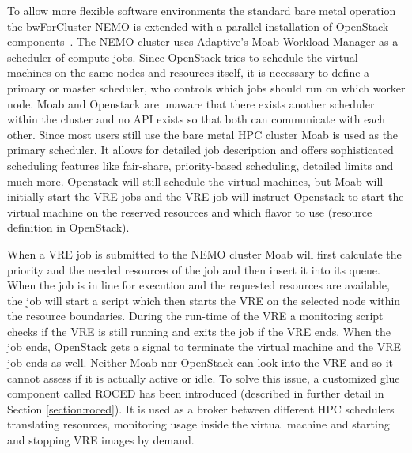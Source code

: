 To allow more flexible software environments the standard bare metal operation
the bwForCluster NEMO is extended with a parallel installation of OpenStack
components~\cite{hpc-symp:2016}.
The NEMO cluster uses Adaptive's Moab Workload Manager as a
scheduler of compute jobs.
Since OpenStack tries to schedule the virtual machines on the same nodes and
resources itself, it is necessary to define a primary or master scheduler, who
controls which jobs should run on which worker node. Moab and Openstack are
unaware that there exists another scheduler within the cluster and no API exists
so that both can communicate with each other. Since most users still use the
bare metal HPC cluster Moab is used as the primary scheduler. It allows for
detailed job description and offers sophisticated scheduling features like
fair-share, priority-based scheduling, detailed limits and much more. Openstack
will still schedule the virtual machines, but Moab will initially start the VRE
jobs and the VRE job will instruct Openstack to start the virtual machine on the
reserved resources and which flavor to use (resource definition in OpenStack).

When a VRE job is submitted to the NEMO cluster Moab will first calculate the
priority and the needed resources of the job and then insert it into its queue.
When the job is in line for execution and the requested resources are available,
the job will start a script which then starts the VRE on the selected node
within the resource boundaries. During the run-time of the VRE a monitoring
script checks if the VRE is still running and exits the job if the VRE ends.
When the job ends, OpenStack gets a signal to terminate the virtual machine and
the VRE job ends as well.  Neither Moab nor OpenStack can look into the VRE and
so it cannot assess if it is actually active or idle. To solve this issue, a
customized glue component called ROCED has been introduced (described in
further detail in Section \ref{section:roced}).  It is used as a broker between
different HPC schedulers translating resources, monitoring usage inside the
virtual machine and starting and stopping VRE images by demand.
